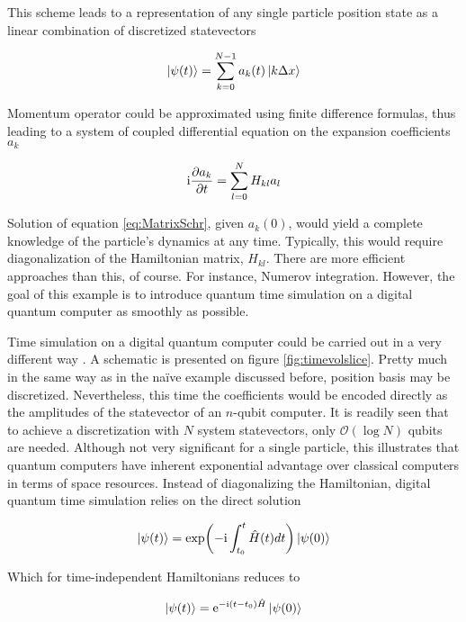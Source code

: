   This scheme leads to a representation of any single particle position state as a linear combination of discretized statevectors

  \begin{equation}
    \ket{\psi(t)} = \sum_{k = 0}^{N-1} a_k(t) \ket{k \Delta x}
  \end{equation}

  Momentum operator could be approximated using finite difference formulas, thus leading to a system of coupled differential equation on the expansion coefficients $a_k$

  \begin{equation}
    \mathrm{i}\pdv{a_k}{t} = \sum_{l = 0}^{N} H_{kl} a_l
    \label{eq:MatrixSchr}
  \end{equation}

  Solution of equation \ref{eq:MatrixSchr}, given $a_k(0)$, would yield a complete knowledge of the particle's dynamics at any time. Typically, this would require diagonalization of the Hamiltonian matrix, $H_{kl}$. There are more efficient approaches than this, of course. For instance, Numerov integration. However, the goal of this example is to introduce quantum time simulation on a digital quantum computer as smoothly as possible.

  Time simulation on a digital quantum computer could be carried out in a very different way \cite{Strini, Nielsen}. A schematic is presented on figure \ref{fig:timevolslice}. Pretty much in the same way as in the naïve example discussed before, position basis may be discretized. Nevertheless, this time the coefficients would be encoded directly as the amplitudes of the statevector of an $n$-qubit computer. It is readily seen that to achieve a discretization with $N$ system statevectors, only $\mathcal{O}(\log{N})$ qubits are needed. Although not very significant for a single particle, this illustrates that quantum computers have inherent exponential advantage over classical computers in terms of space resources. Instead of diagonalizing the Hamiltonian, digital quantum time simulation relies on the direct solution

  \begin{equation}
    \ket{\psi(t)} = \exp(-\mathrm{i}\int_{t_0}^t \hat{H}(t)dt)\ket{\psi(0)}
    \label{eq:UnitaryEvolution}
  \end{equation}

  Which for time-independent Hamiltonians reduces to

  \begin{equation}
    \ket{\psi(t)} = \mathrm{e}^{-\mathrm{i}(t - t_0) \hat{H}}\ket{\psi(0)}
    \label{eq:UnitaryEvolutionNoTime}
  \end{equation}

